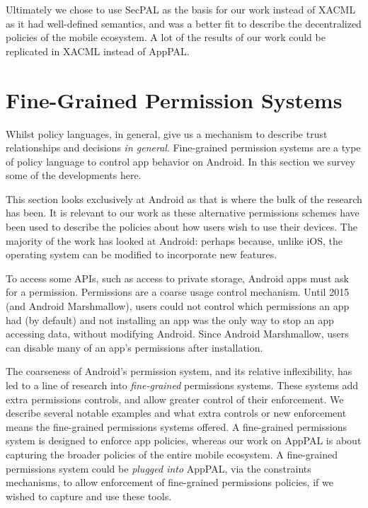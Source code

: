 \documentclass[thesis.tex]{subfiles}
\begin{document}
Ultimately we chose to use SecPAL as the basis for our work instead of XACML as
it had well-defined semantics, and was a better fit to describe the
decentralized policies of the mobile ecosystem. A lot of the results of our work
could be replicated in XACML instead of AppPAL. 


\section{Fine-Grained Permission Systems}
\label{sec:fine-grained-permissions}

Whilst policy languages, in general, give us a mechanism to describe trust
relationships and decisions \emph{in general}. Fine-grained permission
systems are a type of policy language to control app behavior on
Android. In this section we survey some of the developments here.

This section looks exclusively at Android as that is where the bulk of
the research has been. It is relevant to our work as these alternative
permissions schemes have been used to describe the policies about how
users wish to use their devices. The majority of the work has looked
at Android: perhaps because, unlike iOS, the operating system can be
modified to incorporate new features.

To access some APIs, such as access to private storage, Android apps
must ask for a permission. Permissions are a coarse usage control
mechanism. Until 2015 (and Android Marshmallow), users could not
control which permissions an app had (by default) and not installing
an app was the only way to stop an app accessing data, without
modifying Android.  Since Android Marshmallow, users can disable many
of an app's permissions after installation.

The coarseness of Android's permission system, and its relative
inflexibility, has led to a line of research into \emph{fine-grained}
permissions systems.  These systems add extra permissions controls,
and allow greater control of their enforcement. We describe several
notable examples and what extra controls or new enforcement means the
fine-grained permissions systems offered.  A fine-grained permissions
system is designed to enforce app policies, whereas our work on AppPAL
is about capturing the broader policies of the entire mobile
ecosystem.  A fine-grained permissions system could be \emph{plugged
into} AppPAL, via the constraints mechanisms, to allow enforcement of
fine-grained permissions policies, if we wished to capture and use
these tools.
\end{document}
